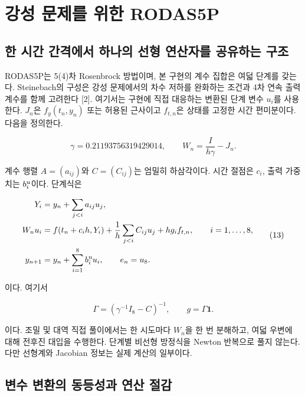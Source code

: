 \documentclass[
  10pt,
  dvipsnames]{article}
\begin{document}
\hypertarget{uxac15uxc131-uxbb38uxc81cuxb97c-uxc704uxd55c-rodas5p}{%
\section{강성 문제를 위한
RODAS5P}\label{uxac15uxc131-uxbb38uxc81cuxb97c-uxc704uxd55c-rodas5p}}

\hypertarget{uxd55c-uxc2dcuxac04-uxac04uxaca9uxc5d0uxc11c-uxd558uxb098uxc758-uxc120uxd615-uxc5f0uxc0b0uxc790uxb97c-uxacf5uxc720uxd558uxb294-uxad6cuxc870}{%
\subsection{한 시간 간격에서 하나의 선형 연산자를 공유하는
구조}\label{uxd55c-uxc2dcuxac04-uxac04uxaca9uxc5d0uxc11c-uxd558uxb098uxc758-uxc120uxd615-uxc5f0uxc0b0uxc790uxb97c-uxacf5uxc720uxd558uxb294-uxad6cuxc870}}

RODAS5P는 5(4)차 Rosenbrock 방법이며, 본 구현의 계수 집합은 여덟 단계를
갖는다. Steinebach의 구성은 강성 문제에서의 차수 저하를 완화하는 조건과
4차 연속 출력 계수를 함께 고려한다 {[}2{]}. 여기서는 구현에 직접
대응하는 변환된 단계 변수 \(u_i\)를 사용한다. \(J_n\)은 \(f_y(t_n,y_n)\)
또는 허용된 근사이고 \(f_{t,n}\)은 상태를 고정한 시간 편미분이다. 다음을
정의한다.

\[
 \gamma=0.21193756319429014,\qquad
 W_n=\frac{I}{h\gamma}-J_n.
 \tag{12}
\]

계수 행렬 \(A=(a_{ij})\)와 \(C=(C_{ij})\)는 엄밀히 하삼각이다. 시간
절점은 \(c_i\), 출력 가중치는 \(b_i^{\rm u}\)이다. 단계식은

\[
\begin{split}
 Y_i&=y_n+\sum_{j<i}a_{ij}u_j,\\
 W_nu_i&=f(t_n+c_i h,Y_i)
       +\frac1h\sum_{j<i}C_{ij}u_j
       +h g_i f_{t,n},\qquad i=1,\ldots,8,\\
 y_{n+1}&=y_n+\sum_{i=1}^8 b_i^{\rm u}u_i,
 \qquad e_n=u_8.
\end{split}
\tag{13}
\]

이다. 여기서

\[
 \Gamma=\left(\gamma^{-1}I_8-C\right)^{-1},\qquad
 g=\Gamma\mathbf1.
 \tag{14}
\]

이다. 조밀 및 대역 직접 풀이에서는 한 시도마다 \(W_n\)을 한 번 분해하고,
여덟 우변에 대해 전후진 대입을 수행한다. 단계별 비선형 방정식을 Newton
반복으로 풀지 않는다. 다만 선형계와 Jacobian 정보는 실제 계산의
일부이다.

\hypertarget{uxbcc0uxc218-uxbcc0uxd658uxc758-uxb3d9uxb4f1uxc131uxacfc-uxc5f0uxc0b0-uxc808uxac10}{%
\subsection{변수 변환의 동등성과 연산
절감}\label{uxbcc0uxc218-uxbcc0uxd658uxc758-uxb3d9uxb4f1uxc131uxacfc-uxc5f0uxc0b0-uxc808uxac10}}
\end{document}

